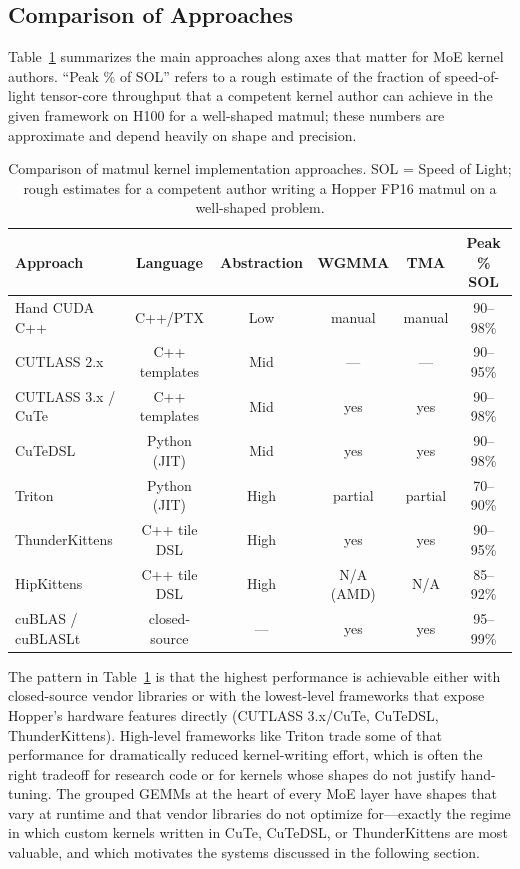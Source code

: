 \documentclass[10pt]{article}
\begin{document}
\subsection{Comparison of Approaches}
\label{sec:matmul-comparison}

Table~\ref{tab:matmul-dsl} summarizes the main approaches along axes that matter for MoE kernel authors. ``Peak \% of SOL'' refers to a rough estimate of the fraction of speed-of-light tensor-core throughput that a competent kernel author can achieve in the given framework on H100 for a well-shaped matmul; these numbers are approximate and depend heavily on shape and precision.

\begin{table}[t]
\caption{Comparison of matmul kernel implementation approaches. SOL = Speed of Light; rough estimates for a competent author writing a Hopper FP16 matmul on a well-shaped problem.}
\label{tab:matmul-dsl}
\centering\small
\begin{tabular}{lccccc}
\toprule
Approach & Language & Abstraction & WGMMA & TMA & Peak \% SOL \\
\midrule
Hand CUDA C++ & C++/PTX & Low & manual & manual & 90--98\% \\
CUTLASS 2.x & C++ templates & Mid & --- & --- & 90--95\% \\
CUTLASS 3.x / CuTe & C++ templates & Mid & yes & yes & 90--98\% \\
CuTeDSL & Python (JIT) & Mid & yes & yes & 90--98\% \\
Triton & Python (JIT) & High & partial & partial & 70--90\% \\
ThunderKittens & C++ tile DSL & High & yes & yes & 90--95\% \\
HipKittens & C++ tile DSL & High & N/A (AMD) & N/A & 85--92\% \\
cuBLAS / cuBLASLt & closed-source & ---  & yes & yes & 95--99\% \\
\bottomrule
\end{tabular}
\end{table}

The pattern in Table~\ref{tab:matmul-dsl} is that the highest performance is achievable either with closed-source vendor libraries or with the lowest-level frameworks that expose Hopper's hardware features directly (CUTLASS 3.x/CuTe, CuTeDSL, ThunderKittens). High-level frameworks like Triton trade some of that performance for dramatically reduced kernel-writing effort, which is often the right tradeoff for research code or for kernels whose shapes do not justify hand-tuning. The grouped GEMMs at the heart of every MoE layer have shapes that vary at runtime and that vendor libraries do not optimize for---exactly the regime in which custom kernels written in CuTe, CuTeDSL, or ThunderKittens are most valuable, and which motivates the systems discussed in the following section.
\end{document}
